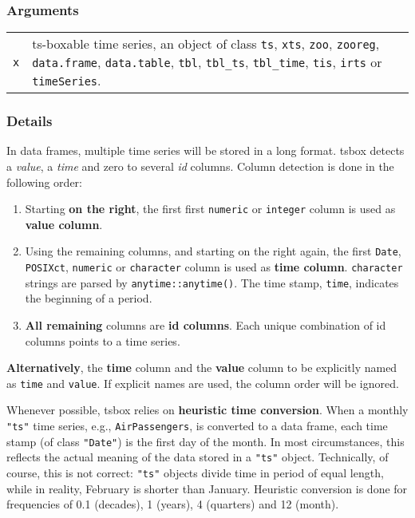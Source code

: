 \documentclass[
  letterpaper,
  DIV=11,
  numbers=noendperiod]{scrreport}
\begin{document}
\subsubsection{Arguments}\label{arguments-50}

\begin{longtable}[]{@{}ll@{}}
\toprule\noalign{}
\endhead
\bottomrule\noalign{}
\endlastfoot
\texttt{x} & ts-boxable time series, an object of class \texttt{ts},
\texttt{xts}, \texttt{zoo}, \texttt{zooreg}, \texttt{data.frame},
\texttt{data.table}, \texttt{tbl}, \texttt{tbl\_ts}, \texttt{tbl\_time},
\texttt{tis}, \texttt{irts} or \texttt{timeSeries}. \\
\end{longtable}

\subsubsection{Details}\label{details-14}

In data frames, multiple time series will be stored in a
\textquotesingle long\textquotesingle{} format. tsbox detects a
\emph{value}, a \emph{time} and zero to several \emph{id} columns.
Column detection is done in the following order:

\begin{enumerate}
\def\labelenumi{\arabic{enumi}.}
\item
  Starting \textbf{on the right}, the first first \texttt{numeric} or
  \texttt{integer} column is used as \textbf{value column}.
\item
  Using the remaining columns, and starting on the right again, the
  first \texttt{Date}, \texttt{POSIXct}, \texttt{numeric} or
  \texttt{character} column is used as \textbf{time column}.
  \texttt{character} strings are parsed by \texttt{anytime::anytime()}.
  The time stamp, \texttt{time}, indicates the beginning of a period.
\item
  \textbf{All remaining} columns are \textbf{id columns}. Each unique
  combination of id columns points to a time series.
\end{enumerate}

\textbf{Alternatively}, the \textbf{time} column and the \textbf{value}
column to be explicitly named as \texttt{time} and \texttt{value}. If
explicit names are used, the column order will be ignored.

Whenever possible, tsbox relies on \textbf{heuristic time conversion}.
When a monthly \texttt{"ts"} time series, e.g., \texttt{AirPassengers},
is converted to a data frame, each time stamp (of class \texttt{"Date"})
is the first day of the month. In most circumstances, this reflects the
actual meaning of the data stored in a \texttt{"ts"} object.
Technically, of course, this is not correct: \texttt{"ts"} objects
divide time in period of equal length, while in reality, February is
shorter than January. Heuristic conversion is done for frequencies of
0.1 (decades), 1 (years), 4 (quarters) and 12 (month).
\end{document}
